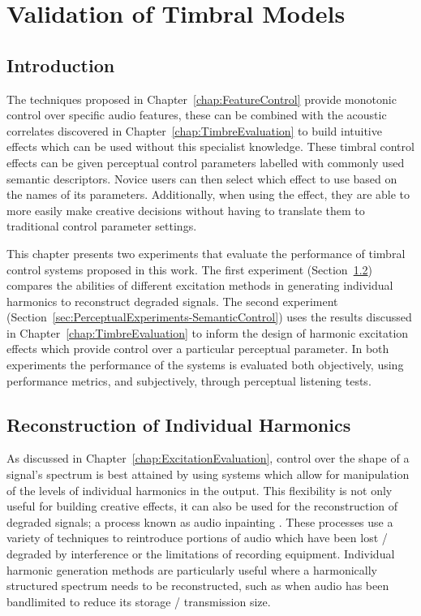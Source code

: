 \chapter{Validation of Timbral Models}
\label{chap:PerceptualExperiments}

\section{Introduction}
\label{sec:PerceptualExperiments-Introduction}
	The techniques proposed in Chapter~\ref{chap:FeatureControl} provide monotonic control over specific audio
	features, these can be combined with the acoustic correlates discovered in Chapter~\ref{chap:TimbreEvaluation} to
	build intuitive effects which can be used without this specialist knowledge. These timbral control effects can be
	given perceptual control parameters labelled with commonly used semantic descriptors. Novice users can then select
	which effect to use based on the names of its parameters. Additionally, when using the effect, they are able to
	more easily make creative decisions without having to translate them to traditional control parameter settings.

	This chapter presents two experiments that evaluate the performance of timbral control systems proposed in this
	work. The first experiment (Section~\ref{sec:PerceptualExperiments-Reconstruction}) compares the abilities of
	different excitation methods in generating individual harmonics to reconstruct degraded signals. The second
	experiment (Section~\ref{sec:PerceptualExperiments-SemanticControl}) uses the results discussed in
	Chapter~\ref{chap:TimbreEvaluation} to inform the design of harmonic excitation effects which provide control over
	a particular perceptual parameter. In both experiments the performance of the systems is evaluated both
	objectively, using performance metrics, and subjectively, through perceptual listening tests.

\section{Reconstruction of Individual Harmonics}
\label{sec:PerceptualExperiments-Reconstruction}
	As discussed in Chapter~\ref{chap:ExcitationEvaluation}, control over the shape of a signal's spectrum is best
	attained by using systems which allow for manipulation of the levels of individual harmonics in the output. This
	flexibility is not only useful for building creative effects, it can also be used for the reconstruction of
	degraded signals; a process known as audio inpainting \citep{adler2012audio}. These processes use a variety of
	techniques to reintroduce portions of audio which have been lost / degraded by interference or the limitations of
	recording equipment. Individual harmonic generation methods are particularly useful where a harmonically structured
	spectrum needs to be reconstructed, such as when audio has been bandlimited to reduce its storage / transmission
	size.

